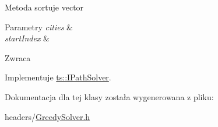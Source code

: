 Metoda sortuje vector


\begin{DoxyParams}{Parametry}
{\em cities} & \\
\hline
{\em start\+Index} & \\
\hline
\end{DoxyParams}
\begin{DoxyReturn}{Zwraca}

\end{DoxyReturn}


Implementuje \mbox{\hyperlink{classts_1_1_i_path_solver_a3d76684ac8ebf47a5edb3af4e0280811}{ts\+::\+I\+Path\+Solver}}.



Dokumentacja dla tej klasy została wygenerowana z pliku\+:\begin{DoxyCompactItemize}
\item 
headers/\mbox{\hyperlink{_greedy_solver_8h}{Greedy\+Solver.\+h}}\end{DoxyCompactItemize}
